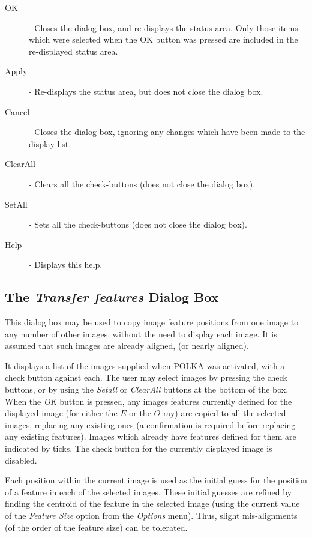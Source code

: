 \documentclass[11pt]{article}
\newcommand{\htmlref}[2]{#1}
\newcommand{\xlabel}[1]{}
\newcommand{\mylabel}[1] {\xlabel{#1}\label{#1}}
\begin{document}
\begin{description}
\item [OK] - Closes the dialog box, and re-displays the status area.
Only those items which were selected when the OK button was pressed are
included in the re-displayed status area.
\item [Apply] - Re-displays the status area, but does not close the
dialog box.
\item [Cancel] - Closes the dialog box, ignoring any changes which have
been made to the display list.
\item [ClearAll] - Clears all the check-buttons (does not close the dialog box).
\item [SetAll] - Sets all the check-buttons (does not close the dialog box).
\item [Help] - Displays this help.
\end{description}

\subsection {\mylabel{POLKA_TRANSFER_DIALOG}The \emph{Transfer features} Dialog Box}
This dialog box may be used to copy image feature positions from one
image to any number of other images, without the need to display each
image. It is assumed that such images are already aligned, (or nearly
aligned).

It displays a list of the images supplied when POLKA was activated, with
a check button against each. The user may select images by pressing the
check buttons, or by using the \emph{Setall} or \emph{ClearAll} buttons at
the bottom of the box. When the \emph{OK} button is pressed, any images
features currently defined for the displayed image (for either the $E$ or
the $O$ ray) are copied to all the selected images, replacing any
existing ones (a confirmation is required before replacing any existing
features). Images which already have features defined for them are
indicated by ticks. The check button for the currently displayed image is
disabled.

Each position within the current image is used as the initial guess for
the position of a feature in each of the selected images. These initial
guesses are refined by finding the centroid of the feature in the
selected image (using the current value of the \htmlref{\emph{Feature
Size}}{POLKA_FEATURE_SIZE} option from the \htmlref{\emph{Options}}
{POLKA_OPTIONS_MENU} menu). Thus, slight mis-alignments (of the order of
the feature size) can be tolerated.
\end{document}
